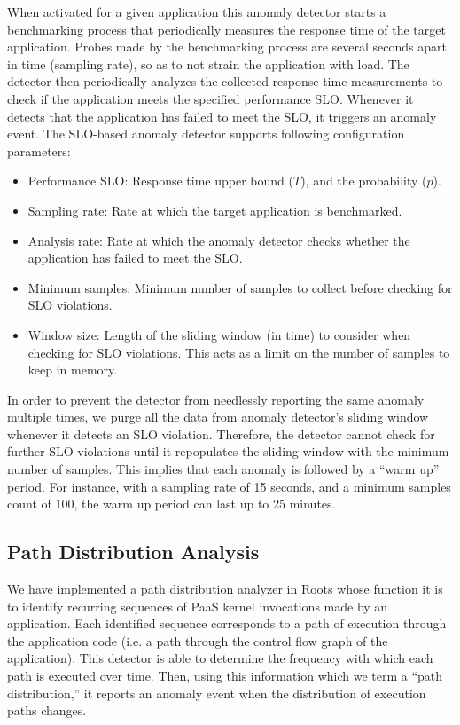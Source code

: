 When activated for a given application this anomaly detector starts a benchmarking process
that periodically measures the response time of the target application. Probes made by the benchmarking 
process are several seconds apart in time (sampling rate), so as to not strain the application with load.
The detector then periodically
analyzes the collected response time measurements to check if the application meets the specified performance
SLO. Whenever it detects that the application has failed to meet the SLO, it triggers an anomaly event. 
The SLO-based anomaly detector supports following configuration parameters:
\begin{itemize}
\item Performance SLO: Response time upper bound ($T$), and the probability ($p$).
\item Sampling rate: Rate at which the target application is benchmarked.
\item Analysis rate: Rate at which the anomaly detector checks whether the application has failed to meet the SLO.
\item Minimum samples: Minimum number of samples to collect before checking for SLO violations.
\item Window size: Length of the sliding window (in time) to consider when checking for SLO violations. This
acts as a limit on the number of samples to keep in memory.
\end{itemize}

In order to prevent the detector from needlessly reporting the same anomaly multiple times,
we purge all the data from anomaly detector's sliding window whenever it detects an SLO violation.
Therefore, the detector cannot check for further SLO violations until it repopulates the sliding window 
with the minimum number of samples. This implies that each anomaly is followed by a ``warm up'' period.
For instance, with a sampling rate of 15 seconds, and a minimum
samples count of 100, the warm up period can last up to 25 minutes.

\subsection{Path Distribution Analysis}

We have implemented a path distribution analyzer
in Roots whose function it is to identify recurring sequences of
PaaS kernel invocations made by an application.
Each identified sequence corresponds to a path of
execution through the application code (i.e. a path through the control flow graph of the application). 
This detector is able to determine the frequency with
which each path is executed over time. Then, using this information which we term
a ``path distribution,'' it reports an anomaly event when the distribution of execution paths
changes. 

